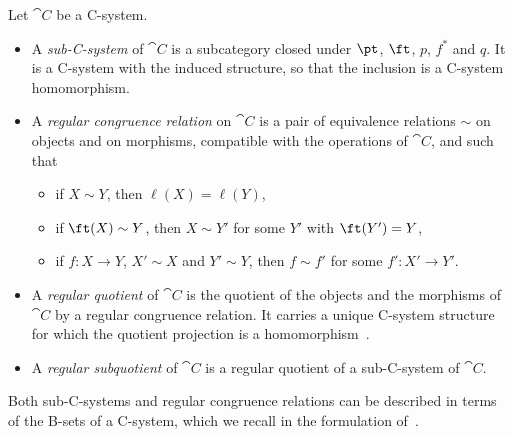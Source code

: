 \begin{definition}\label{def:regular-subquotient}
    Let $\cat{C}$ be a C-system.
    \begin{itemize}
        \item A \emph{sub-C-system} of $\cat{C}$ is a subcategory closed under $\pt$, $\ft$, $p$, $f^*$ and $q$. It is a C-system with the induced structure, so that the inclusion is a C-system homomorphism.
        \item A \emph{regular congruence relation} on $\cat{C}$ is a pair of equivalence relations $\sim$ on objects and on morphisms, compatible with the operations of $\cat{C}$, and such that
        \begin{itemize}
            \item if $X \sim Y$, then $\ell(X) = \ell(Y)$,
            \item if $\ft(X) \sim Y$, then $X \sim Y'$ for some $Y'$ with $\ft(Y') = Y$,
            \item if $f : X \to Y$, $X' \sim X$ and $Y' \sim Y$, then $f \sim f'$ for some $f' : X' \to Y'$.
        \end{itemize}
        \item A \emph{regular quotient} of $\cat{C}$ is the quotient of the objects and the morphisms of $\cat{C}$ by a regular congruence relation. It carries a unique C-system structure for which the quotient projection is a homomorphism~\cite[Lemma~5.2]{Voevodsky2014Subsystems}.
        \item A \emph{regular subquotient} of $\cat{C}$ is a regular quotient of a sub-C-system of $\cat{C}$.
    \end{itemize}
\end{definition}

Both sub-C-systems and regular congruence relations can be described in terms of the B-sets of a C-system, which we recall in the formulation of~\cite{AhrensEmmeneggerNorthRijke2025}.

